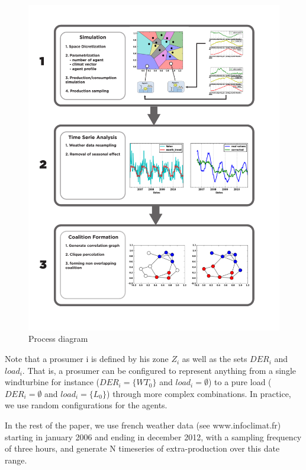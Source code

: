 \documentclass[conference]{IEEEtran}
\begin{document}
\begin{figure}
\includegraphics[scale=.45]{Fig2.pdf}
\caption{Process diagram}
\label{fig:process}
\end{figure}

Note that a prosumer i is defined by his zone $ Z_{i} $ as well as the sets $ DER_{i} $ and $ load_{i} $. That is, a prosumer can be configured to represent anything from a single windturbine for instance ($ DER_{i} = \{ WT_{0} \} $ and $ load_{i} = \emptyset $) to a pure load ($ DER_{i} = \emptyset $ and $ load_{i} = \{ L_{0} \} $) through more complex combinations. In practice, we use random configurations for the agents.

In the rest of the paper, we use french weather data (see www.infoclimat.fr) starting in january 2006 and ending in december 2012, with a sampling frequency of three hours, and generate N timeseries of extra-production over this date range.



%
%
\end{document}
